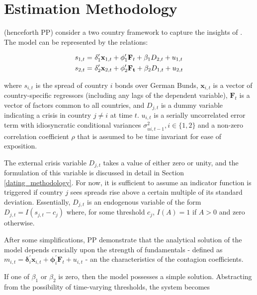 \documentclass[../base.tex]{subfiles}
\begin{document}
\section{Estimation Methodology}
\label{est}

\cite{pesaran2007econometric} (henceforth PP) consider a two country framework to capture the insights of \cite{masson1999contagion}. The model can be represented by the relations:

\begin{align} 
	s_{1,t} =&~\mathbf{\delta}_1^{\prime} \mathbf{x}_{1,t} + \mathbf{\phi}_1^{\prime} \mathbf{F}_t + \beta_1 D_{2,t} + u_{1,t} \label{eqn:system}\\
	s_{2,t} =&~\boldmath{\delta}_2^{\prime} \mathbf{x}_{2,t} + \mathbf{\phi}_2^{\prime} \mathbf{F_t} + \beta_2 D_{1,t} + u_{2,t} \label{eqn:system2}
\end{align}

where $s_{i,t}$ is the spread of country $i$ bonds over German Bunds, $\mathbf{x}_{i,t}$ is a vector of country-specific regressors (including any lags of the dependent variable), $\mathbf{F}_t$ is a vector of factors common to all countries, and $D_{j, t}$ is a dummy variable indicating a crisis in country $j \neq i$ at time $t$. $u_{i, t}$ is a serially uncorrelated error term with idiosyncratic conditional variances $\sigma^2_{ui, t-1}, i \in \{1, 2\}$ and a non-zero correlation coefficient $\rho$ that is assumed to be time invariant for ease of exposition. 

The external crisis variable $D_{j, t}$ takes a value of either zero or unity, and the formulation of this variable is discussed in detail in Section \ref{dating_methodology}. For now, it is sufficient to assume an indicator function is triggered if country $j$ sees spreads rise above a certain multiple of its standard deviation. Essentially, $D_{j,t}$ is an endogenous variable of the form $D_{j, t} = I(s_{j, t} - c_j)$ where, for some threshold $c_j$, $I(A) = 1$ if $A >0$ and zero otherwise.

After some simplifications, PP demonstrate that the analytical solution of the model depends crucially upon the strength of fundamentals - defined as $m_{i,t} = \mathbf{\delta}_i^{\prime} \mathbf{x}_{i,t} + \mathbf{\phi}_i^{\prime} \mathbf{F}_t + u_{i,t}$ - an the characteristics of the contagion coefficients. 

If one of $\beta_1$ or $\beta_2$ is zero, then the model possesses a simple solution. Abstracting from the possibility of time-varying thresholds, the system becomes
\end{document}
